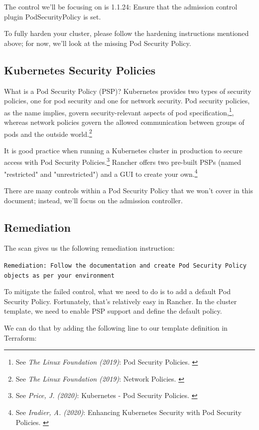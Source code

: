 The control we'll be focusing on is 1.1.24: Ensure that the admission control plugin PodSecurityPolicy is set.

To fully harden your cluster, please follow the hardening instructions mentioned above; for now, we'll look at the missing Pod Security Policy.

\subsection{Kubernetes Security Policies}

What is a Pod Security Policy (PSP)? Kubernetes provides two types of security policies, one for pod security and one for network security. Pod security policies, as the name implies, govern security-relevant aspects of pod specification,\footnote{See \textit{The Linux Foundation (2019)}: Pod Security Policies. \cite{podSecurity}}, whereas network policies govern the allowed communication between groups of pods and the outside world.\footnote{See \textit{The Linux Foundation (2019)}: Network Policies. \cite{netSecurity}}

It is good practice when running a Kubernetes cluster in production to secure access with Pod Security Policies.\footnote{See \textit{Price, J. (2020)}: Kubernetes - Pod Security Policies. \cite{examplePsp}} Rancher offers two pre-built PSPs (named "restricted" and "unrestricted") and a GUI to create your own.\footnote{See \textit{Iradier, A. (2020)}: Enhancing Kubernetes Security with Pod Security Policies. \cite{detailPsp}}

There are many controls within a Pod Security Policy that we won't cover in this document; instead, we'll focus on the admission controller.

\subsection{Remediation}

The scan gives us the following remediation instruction:

\verb|Remediation: Follow the documentation and create Pod Security Policy objects as per your environment|

To mitigate the failed control, what we need to do is to add a default Pod Security Policy. Fortunately, that's relatively easy in Rancher. In the cluster template, we need to enable PSP support and define the default policy.

We can do that by adding the following line to our template definition in Terraform:

